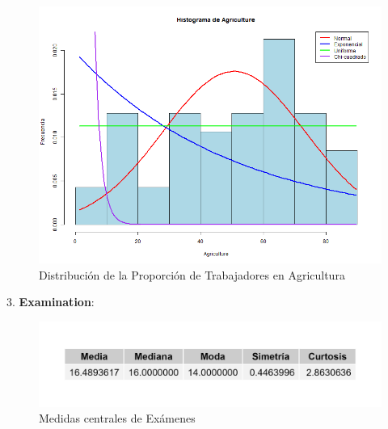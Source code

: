 \documentclass{article}
\begin{document}
       \begin{figure}[h!]
        \centering
        \includegraphics[width=\textwidth]{Histogramas/histogram_agriculture.png}
        \caption{Distribución de la Proporción de Trabajadores en Agricultura}
        \end{figure}
   
   3. \textbf{Examination}:
   \begin{figure}[h!]
 \centering
 \includegraphics[width=\textwidth]{Swiss/Examination_central.png}
 \caption{Medidas centrales de Exámenes}
\end{figure}
\end{document}
